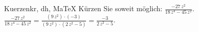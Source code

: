 \begin{MAufgabe}{Kuerzen}{kr, dh, MaTeX}
K\"urzen Sie soweit m\"oglich: $\frac{- 27\, z^2}{18\, z^4 - 45\, z^2}$.\\ 
\ifLsg\MLoesung
\quad $\frac{- 27\, z^2}{18\, z^4 - 45\, z^2}=\frac{(9\, z^2)\cdot(-3)}{(9\, z^2)\cdot(2\, z^2 - 5)}=\frac{-3}{2\, z^2 - 5}$.\else\relax\fi
 \end{MAufgabe}